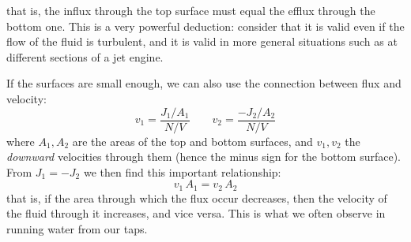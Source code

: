 \documentclass[a4paper,12pt,%
onecolumn,oneside,titlepage,%
british%
]{memoir}
\renewcommand*{\|}[1][]{\nonscript\:#1\vert\nonscript\:\mathopen{}}
\newcommand*{\yN}{N}
\newcommand*{\yJ}{J}
\begin{document}
that is, the influx through the top surface must equal the efflux through the bottom one.
This is a very powerful deduction: consider that it is valid even if the flow of the fluid is turbulent, and it is valid in more general situations such as at different sections of a jet engine.

\medskip

If the surfaces are small enough, we can also use the {connection between flux and velocity}:
\begin{equation*}
  v_{1} = \frac{\yJ_{1}/A_{1}}{\yN/V}
  \qquad
  v_{2} = \frac{-\yJ_{2}/A_{2}}{\yN/V}
\end{equation*}
where $A_{1}, A_{2}$ are  the areas  of the top and bottom surfaces, and $v_{1}, v_{2}$ the \emph{downward} velocities through them (hence the minus sign for the bottom surface). From $\yJ_{1} = -\yJ_{2}$ we then find this important relationship:
\begin{equation*}
  v_{1}\,A_{1} = v_{2}\,A_{2}
\end{equation*}
that is, if the area through which the flux occur decreases, then the velocity of the fluid through it increases, and vice versa.
%
%
This is  what we often observe in running water from our taps.

\bigskip
\end{document}
